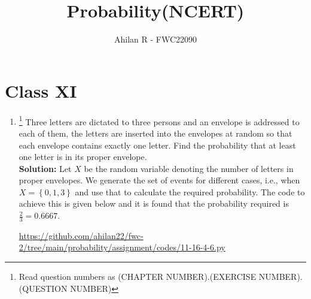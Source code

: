 \documentclass[journal,12pt,twocolumn]{IEEEtran}
\providecommand{\cbrak}[1]{\ensuremath{\left\{#1\right\}}}
\newcommand{\solution}{\noindent \textbf{Solution: }}
\newcommand*{\permcomb}[4][0mu]{{{}^{#3}\mkern#1#2_{#4}}}
\newcommand*{\comb}[1][-1mu]{\permcomb[#1]{C}}
\newcommand\numberthis{\addtocounter{equation}{1}\tag{\theequation}}
\begin{document}
\title{Probability(NCERT)}
\author{Ahilan R - FWC22090
	}

\maketitle

\section*{Class XI}

\begin{enumerate}[label=16.\arabic{enumi}.\arabic{enumii}]%
\setcounter{enumi}{3}
\setcounter{enumii}{6}
\item \footnote{Read question numbers as (CHAPTER NUMBER).(EXERCISE NUMBER).(QUESTION NUMBER)} Three letters are dictated to three persons and an envelope is addressed to each of them, the letters are inserted into the envelopes at random so that each envelope contains exactly one letter. Find the probability that at least one letter is in its proper envelope.\\
  \solution
		Let $X$ be the random variable denoting the number of letters in proper envelopes. We generate the set of events for different cases, i.e., when $X = \cbrak{0,1,3}$ and use that to calculate the required probability. The code to achieve this is given below and it is found that the probability required is $\frac{2}{3} = 0.6667$.

\smallskip
		\url{https://github.com/ahilan22/fwc-2/tree/main/probability/assignment/codes/11-16-4-6.py}
\end{enumerate}
\end{document}
